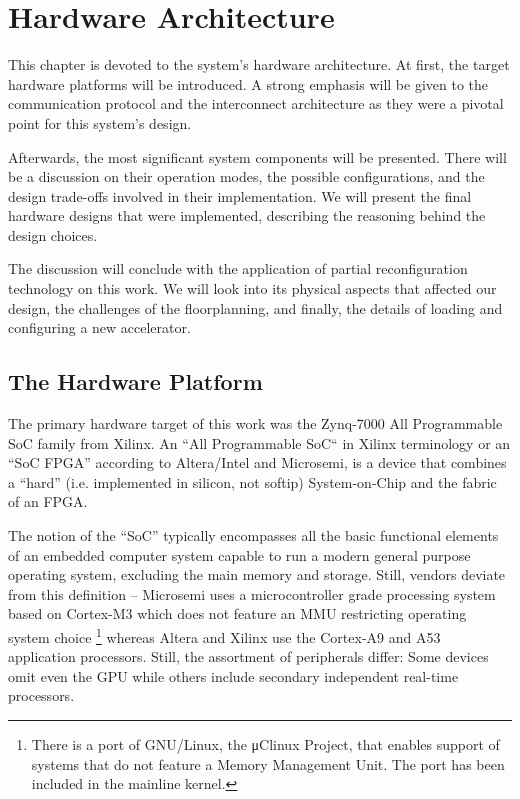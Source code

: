\chapter{Hardware Architecture}

This chapter is devoted to the system's hardware architecture.
At first, the target hardware platforms will be introduced.
A strong emphasis will be given to the communication protocol and the interconnect architecture
as they were a pivotal point for this system's design.

Afterwards, the most significant system components will be presented.
There will be a discussion on their operation modes, 
the possible configurations, and the design trade-offs involved in their implementation.
We will present the final hardware designs that were implemented,
describing the reasoning behind the design choices.

The discussion will conclude with the application of partial reconfiguration technology
on this work. We will look into its physical aspects that affected our design,
the challenges of the floorplanning, and finally, the details of loading and configuring
a new accelerator.

\section{The Hardware Platform}

The primary hardware target of this work was the Zynq-7000 All Programmable SoC family from Xilinx.
An ``All Programmable SoC`` in Xilinx terminology or an ``SoC FPGA'' according to Altera/Intel and Microsemi,
is a device that combines a ``hard'' (i.e. implemented in silicon, not \gls{softip}) System-on-Chip
and the \gls{fabric} of an FPGA.

The notion of the ``SoC'' typically encompasses all the basic functional elements of
an embedded computer system capable to run a modern general purpose operating system,
excluding the main memory and storage. Still, vendors deviate from this definition --
Microsemi uses a microcontroller grade processing system based on Cortex-M3
which does not feature an MMU restricting operating system choice
\footnote{There is a port of GNU/Linux, the μClinux Project, that enables support of systems
that do not feature a Memory Management Unit. The port has been included in the mainline kernel.}
whereas Altera and Xilinx use the Cortex-A9 and A53 application processors. 
Still, the assortment of peripherals differ: 
Some devices omit even the GPU while others include secondary independent real-time processors.

